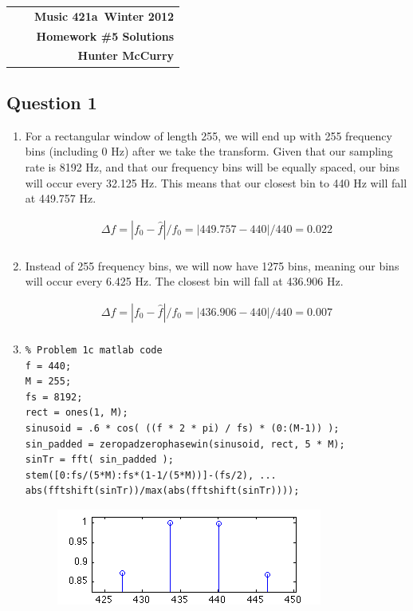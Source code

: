 \documentclass[11pt]{article}
\makeatletter
\newcommand{\course}{Music 421a}
\newcommand{\semester}{Winter 2012}
\newcommand{\hwk}{Homework \#5 Solutions}
\newcommand{\student}{Hunter McCurry}
\renewcommand\maketitle{
\begin{center}
\begin{tabular*}{6.44in}{l @{\extracolsep{\fill}}c r}
\bfseries  &  & \bfseries \course ~\semester \\
\bfseries&  & \bfseries  \hwk  \\
\bfseries   &   &  \bfseries \student \\ 
\end{tabular*}
\end{center} }
\makeatother
\begin{document}
\maketitle
\thispagestyle{plain}


\noindent 


\subsection*{Question 1}
\begin{enumerate}
\item For a rectangular window of length 255, we will end up with 255 frequency bins (including 0 Hz) after we take the transform. Given that our sampling rate is 8192 Hz, and that our frequency bins will be equally spaced, our bins will occur every 32.125 Hz. This means that our closest bin to 440 Hz will fall at 449.757 Hz.

\begin{eqnarray*}
\Delta f = |f_0 - \hat f | / f_0 =  |449.757 - 440| / 440 =  0.022 \\
\end{eqnarray*}

\item Instead of 255 frequency bins, we will now have 1275 bins, meaning our bins will occur every 6.425 Hz. The closest bin will fall at 436.906 Hz.

\begin{eqnarray*}
\Delta f = |f_0 - \hat f | / f_0 =  |436.906 - 440| / 440 =  0.007 \\
\end{eqnarray*}

\item 

\begin{verbatim}
% Problem 1c matlab code
f = 440;
M = 255;
fs = 8192;
rect = ones(1, M);
sinusoid = .6 * cos( ((f * 2 * pi) / fs) * (0:(M-1)) );
sin_padded = zeropadzerophasewin(sinusoid, rect, 5 * M);
sinTr = fft( sin_padded );
stem([0:fs/(5*M):fs*(1-1/(5*M))]-(fs/2), ...
abs(fftshift(sinTr))/max(abs(fftshift(sinTr))));
\end{verbatim}

\begin{figure}[!h]
\includegraphics[scale=.75]{1a_peak}
\end{figure}


\end{enumerate}
\end{document}
